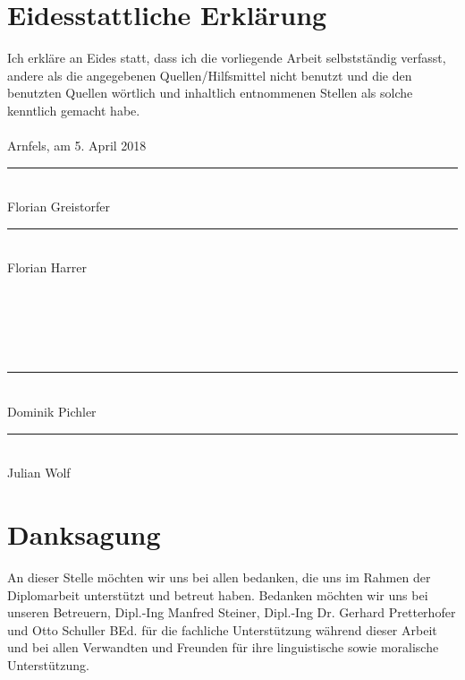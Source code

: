 \frontmatter
{}
\addtocounter{page}{2}

\newcommand{\doublesignature}[1]{%
  \parbox{\textwidth}{
    \hfill
    \parbox{7cm}{
      \centering
      \rule{6cm}{1pt}\\
      Florian Greistorfer
    }
    \parbox{7cm}{
      \centering
      \rule{6cm}{1pt}\\
      Florian Harrer
    }
  }
}
\newcommand{\doublesign}[1]{%
\mbox{}\\
\mbox{}\\
\mbox{}\\
\mbox{}\\
  \parbox{\textwidth}{
    \hfill
    \parbox{7cm}{
      \centering
      \rule{6cm}{1pt}\\
      Dominik Pichler
    }
    \parbox{7cm}{
      \centering
      \rule{6cm}{1pt}\\
      Julian Wolf
    }
  }
}

\vspace*{20pt}

\section*{Eidesstattliche Erklärung}
\label{sec:eidestattliche-erklaerung}
Ich erkläre an Eides statt, dass ich die vorliegende Arbeit selbstständig verfasst, andere als die angegebenen
Quellen/Hilfsmittel nicht benutzt und die den benutzten Quellen wörtlich und inhaltlich entnommenen
Stellen als solche kenntlich gemacht habe.\\
\\
Arnfels, am 5. April 2018\\

\vskip 1cm

\doublesignature{}
\doublesign{}

\vskip 5cm

\clearpage

\newpage
\thispagestyle{empty}
\mbox{}

\clearpage

\section*{Danksagung}
\label{sec:danksagung}
An dieser Stelle möchten wir uns bei allen bedanken, die uns im Rahmen der Diplomarbeit unterstützt und
betreut haben.
Bedanken möchten wir uns bei unseren Betreuern, Dipl.-Ing Manfred Steiner, Dipl.-Ing Dr. Gerhard Pretterhofer
und Otto Schuller BEd. für die fachliche Unterstützung während dieser Arbeit und bei allen Verwandten und Freunden für ihre linguistische sowie moralische Unterstützung.


